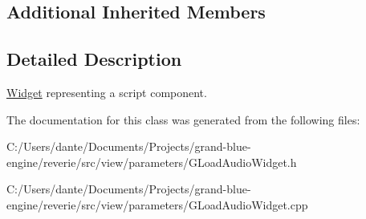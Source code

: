\subsection*{Additional Inherited Members}


\subsection{Detailed Description}
\mbox{\hyperlink{class_widget}{Widget}} representing a script component. 

The documentation for this class was generated from the following files\+:\begin{DoxyCompactItemize}
\item 
C\+:/\+Users/dante/\+Documents/\+Projects/grand-\/blue-\/engine/reverie/src/view/parameters/G\+Load\+Audio\+Widget.\+h\item 
C\+:/\+Users/dante/\+Documents/\+Projects/grand-\/blue-\/engine/reverie/src/view/parameters/G\+Load\+Audio\+Widget.\+cpp\end{DoxyCompactItemize}
